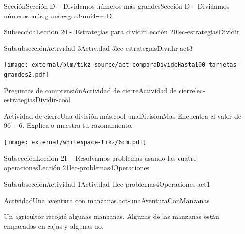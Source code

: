 \begin{sectionptx}{Sección}{Sección D -~Dividamos números más grandes}{}{Sección D -~Dividamos números más grandes}{}{}{gra3-uni4-secD}
\begin{subsectionptx}{Subsección}{Lección 20 -~Estrategias para dividir}{}{Lección 20}{}{}{lec-estrategiasDividir}
\begin{subsubsectionptx}{Subsubsección}{Actividad 3}{}{Actividad 3}{}{}{lec-estrategiasDividir-act3}
\begin{cutoutpage}
\begin{image}{0}{1}{0}{}%
\texttt{[image: external/blm/tikz-source/act-comparaDivideHasta100-tarjetas-grandes2.pdf]}
\end{image}%
\end{cutoutpage}
\end{subsubsectionptx}
%
%
\typeout{************************************************}
\typeout{************************************************}
%
\begin{reading-questions-subsubsection}{Preguntas de comprensión}{Actividad de cierre}{}{Actividad de cierre}{}{}{lec-estrategiasDividir-cool}
\begin{project}{Actividad de cierre}{Una división más.}{cool-unaDivisionMas}%
Encuentra el valor de \(96 \div 6\). Explica o muestra tu razonamiento.%
\begin{image}{0}{1}{0}{}%
\texttt{[image: external/whitespace-tikz/6cm.pdf]}
\end{image}%
\end{project}%
\end{reading-questions-subsubsection}
\end{subsectionptx}
%
%
\typeout{************************************************}
\typeout{************************************************}
%
\begin{subsectionptx}{Subsección}{Lección 21 -~Resolvamos problemas usando las cuatro operaciones}{}{Lección 21}{}{}{lec-problemas4Operaciones}
%
%
\typeout{************************************************}
\typeout{************************************************}
%
\clearpage
\begin{subsubsectionptx}{Subsubsección}{Actividad 1}{}{Actividad 1}{}{}{lec-problemas4Operaciones-act1}
\begin{activity}{Actividad}{Una aventura con manzanas.}{act-unaAventuraConManzanas}%
\begin{sidebyside}{2}{0}{0}{0.1}%
\begin{sbspanel}{0.6}%
Un agricultor recogió algunas manzanas. Algunas de las manzanas están empacadas en cajas y algunas no.%
\end{sbspanel}%
\begin{sbspanel}{0.3}%

\end{sbspanel}
\end{sidebyside}
\end{activity}
\end{subsubsectionptx}
\end{subsectionptx}
\end{sectionptx}
